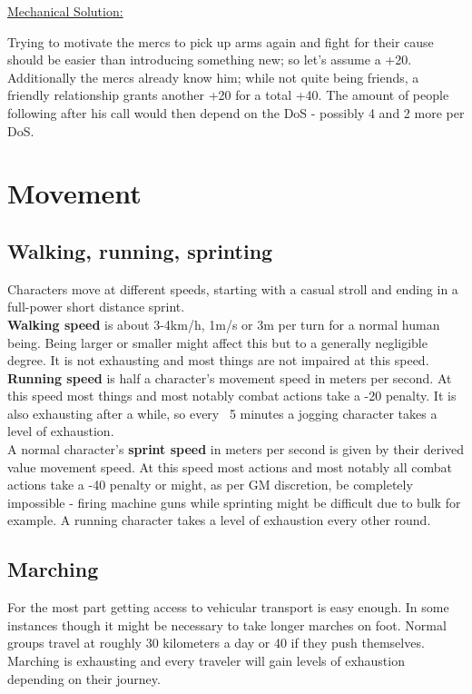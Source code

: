 \documentclass[12pt,a4paper,openany]{book}
\begin{document}
	\ul{Mechanical Solution:}
	\begin{exampleblock}
		Trying to motivate the mercs to pick up arms again and fight for their cause should be easier than introducing something new; so let's assume a +20. Additionally the mercs already know him; while not quite being friends, a friendly relationship grants another +20 for a total +40. The amount of people following after his call would then depend on the DoS - possibly 4 and 2 more per DoS.
	\end{exampleblock}

	\chapter{Movement}
	\section{Walking, running, sprinting}
	Characters move at different speeds, starting with a casual stroll and ending in a full-power short distance sprint.\\
	\textbf{Walking speed} is about 3-4km/h, 1m/s or 3m per turn for a normal human being. Being larger or smaller might affect this but to a generally negligible degree. It is not exhausting and most things are not impaired at this speed.\\
	\textbf{Running speed} is half a character’s movement speed in meters per second. At this speed most things and most notably combat actions take a -20 penalty. It is also exhausting after a while, so every ~5 minutes a jogging character takes a level of exhaustion.\\
	A normal character’s \textbf{sprint speed} in meters per second is given by their derived value movement speed. At this speed most actions and most notably all combat actions take a -40 penalty or might, as per GM discretion, be completely impossible - firing machine guns while sprinting might be difficult due to bulk for example. A running character takes a level of exhaustion every other round.
	\section{Marching}
	For the most part getting access to vehicular transport is easy enough. In some instances though it might be necessary to take longer marches on foot. Normal groups travel at roughly 30 kilometers a day or 40 if they push themselves. Marching is exhausting and every traveler will gain levels of exhaustion depending on their journey.
\end{document}
